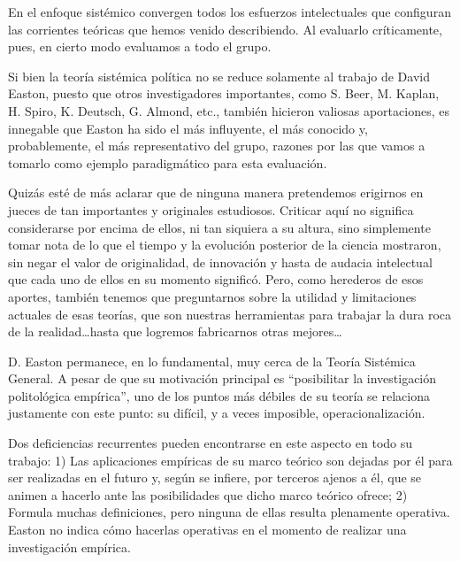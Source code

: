 \documentclass[
]{book}
\begin{document}
En el enfoque sistémico convergen todos los esfuerzos intelectuales que configuran las corrientes teóricas que hemos venido describiendo. Al evaluarlo críticamente, pues, en cierto modo evaluamos a todo el grupo.

Si bien la teoría sistémica política no se reduce solamente al trabajo de David Easton, puesto que otros investigadores importantes, como S. Beer, M. Kaplan, H. Spiro, K. Deutsch, G. Almond, etc., también hicieron valiosas aportaciones, es innegable que Easton ha sido el más influyente, el más conocido y, probablemente, el más representativo del grupo, razones por las que vamos a tomarlo como ejemplo paradigmático para esta evaluación.

Quizás esté de más aclarar que de ninguna manera pretendemos erigirnos en jueces de tan importantes y originales estudiosos. Criticar aquí no significa considerarse por encima de ellos, ni tan siquiera a su altura, sino simplemente tomar nota de lo que el tiempo y la evolución posterior de la ciencia mostraron, sin negar el valor de originalidad, de innovación y hasta de audacia intelectual que cada uno de ellos en su momento significó. Pero, como herederos de esos aportes, también tenemos que preguntarnos sobre la utilidad y limitaciones actuales de esas teorías, que son nuestras herramientas para trabajar la dura roca de la realidad\ldots hasta que logremos fabricarnos otras mejores\ldots{}

D. Easton permanece, en lo fundamental, muy cerca de la Teoría Sistémica General. A pesar de que su motivación principal es ``posibilitar la investigación politológica empírica'', uno de los puntos más débiles de su teoría se relaciona justamente con este punto: su difícil, y a veces imposible, operacionalización.

Dos deficiencias recurrentes pueden encontrarse en este aspecto en todo su trabajo: 1) Las aplicaciones empíricas de su marco teórico son dejadas por él para ser realizadas en el futuro y, según se infiere, por terceros ajenos a él, que se animen a hacerlo ante las posibilidades que dicho marco teórico ofrece; 2) Formula muchas definiciones, pero ninguna de ellas resulta plenamente operativa. Easton no indica cómo hacerlas operativas en el momento de realizar una investigación empírica.
\end{document}
